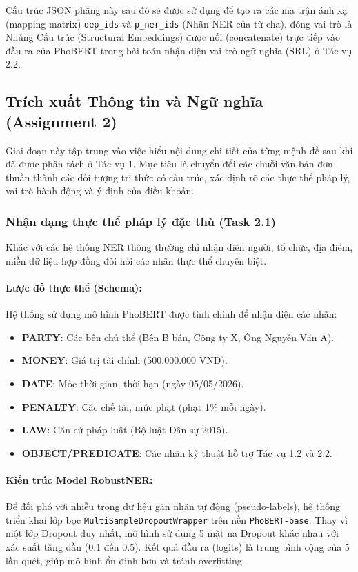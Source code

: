 Cấu trúc JSON phẳng này sau đó sẽ được sử dụng để tạo ra các ma trận ánh xạ (mapping matrix) \texttt{dep\_ids} và \texttt{p\_ner\_ids} (Nhãn NER của từ cha), đóng vai trò là Nhúng Cấu trúc (Structural Embeddings) được nối (concatenate) trực tiếp vào đầu ra của PhoBERT trong bài toán nhận diện vai trò ngữ nghĩa (SRL) ở Tác vụ 2.2.

\subsection{Trích xuất Thông tin và Ngữ nghĩa (Assignment 2)}

Giai đoạn này tập trung vào việc hiểu nội dung chi tiết của từng mệnh đề sau khi đã được phân tách ở Tác vụ 1. Mục tiêu là chuyển đổi các chuỗi văn bản đơn thuần thành các đối tượng tri thức có cấu trúc, xác định rõ các thực thể pháp lý, vai trò hành động và ý định của điều khoản.

\subsubsection{Nhận dạng thực thể pháp lý đặc thù (Task 2.1)}

Khác với các hệ thống NER thông thường chỉ nhận diện người, tổ chức, địa điểm, miền dữ liệu hợp đồng đòi hỏi các nhãn thực thể chuyên biệt.

\paragraph{Lược đồ thực thể (Schema):}
Hệ thống sử dụng mô hình PhoBERT được tinh chỉnh để nhận diện các nhãn:
\begin{itemize}
    \item \textbf{PARTY}: Các bên chủ thể (Bên B bán, Công ty X, Ông Nguyễn Văn A).
    \item \textbf{MONEY}: Giá trị tài chính (500.000.000 VNĐ).
    \item \textbf{DATE}: Mốc thời gian, thời hạn (ngày 05/05/2026).
    \item \textbf{PENALTY}: Các chế tài, mức phạt (phạt 1\% mỗi ngày).
    \item \textbf{LAW}: Căn cứ pháp luật (Bộ luật Dân sự 2015).
    \item \textbf{OBJECT/PREDICATE}: Các nhãn kỹ thuật hỗ trợ Tác vụ 1.2 và 2.2.
\end{itemize}

\paragraph{Kiến trúc Model RobustNER:}
Để đối phó với nhiễu trong dữ liệu gán nhãn tự động (pseudo-labels), hệ thống triển khai lớp bọc \texttt{MultiSampleDropoutWrapper} trên nền \texttt{PhoBERT-base}. Thay vì một lớp Dropout duy nhất, mô hình sử dụng 5 mặt nạ Dropout khác nhau với xác suất tăng dần ($0.1$ đến $0.5$). 
Kết quả đầu ra (logits) là trung bình cộng của 5 lần quét, giúp mô hình ổn định hơn và tránh overfitting.

